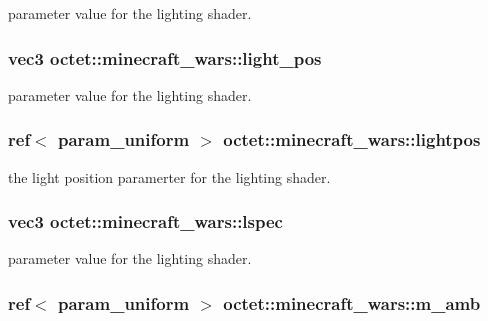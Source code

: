 parameter value for the lighting shader. 

\hypertarget{classoctet_1_1minecraft__wars_adefdca5fc9d714ac66a152067de88899}{
\subsubsection[{light\+\_\+pos}]{\setlength{\rightskip}{0pt plus 5cm}vec3 octet\+::minecraft\+\_\+wars\+::light\+\_\+pos\hspace{0.3cm}{\ttfamily [private]}}}\label{classoctet_1_1minecraft__wars_adefdca5fc9d714ac66a152067de88899}


parameter value for the lighting shader. 

\hypertarget{classoctet_1_1minecraft__wars_aec22f87413969e6f3f86775d38e82ab3}{
\subsubsection[{lightpos}]{\setlength{\rightskip}{0pt plus 5cm}ref$<$ param\+\_\+uniform $>$ octet\+::minecraft\+\_\+wars\+::lightpos\hspace{0.3cm}{\ttfamily [private]}}}\label{classoctet_1_1minecraft__wars_aec22f87413969e6f3f86775d38e82ab3}


the light position paramerter for the lighting shader. 

\hypertarget{classoctet_1_1minecraft__wars_ae6f1a1adea97bff38101b79064781cea}{
\subsubsection[{lspec}]{\setlength{\rightskip}{0pt plus 5cm}vec3 octet\+::minecraft\+\_\+wars\+::lspec\hspace{0.3cm}{\ttfamily [private]}}}\label{classoctet_1_1minecraft__wars_ae6f1a1adea97bff38101b79064781cea}


parameter value for the lighting shader. 

\hypertarget{classoctet_1_1minecraft__wars_af42f249968d7364bf5ebaf34aa04e86c}{
\subsubsection[{m\+\_\+amb}]{\setlength{\rightskip}{0pt plus 5cm}ref$<$ param\+\_\+uniform $>$ octet\+::minecraft\+\_\+wars\+::m\+\_\+amb\hspace{0.3cm}{\ttfamily [private]}}}\label{classoctet_1_1minecraft__wars_af42f249968d7364bf5ebaf34aa04e86c}


